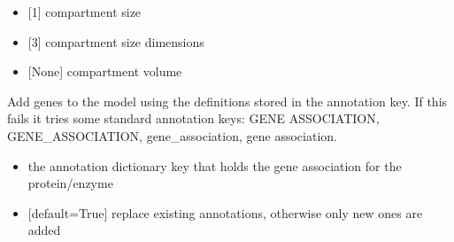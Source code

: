 \documentclass[letterpaper,10pt,english]{sphinxmanual}
\begin{document}
\begin{fulllineitems}
\begin{fulllineitems}
\begin{itemize}
\item {} 
\sphinxAtStartPar
{} {[}1{]} compartment size

\item {} 
\sphinxAtStartPar
{} {[}3{]} compartment size dimensions

\item {} 
\sphinxAtStartPar
{} {[}None{]} compartment volume

\end{itemize}

\end{fulllineitems}


\begin{fulllineitems}
\label{\detokenize{modules_doc:cbmpy.CBModel.Model.createGeneAssociationsFromAnnotations}}
\pysigstartsignatures
{}
\pysigstopsignatures
\sphinxAtStartPar
Add genes to the model using the definitions stored in the annotation key. If this fails it tries some standard annotation
keys: GENE ASSOCIATION, GENE\_ASSOCIATION, gene\_association, gene association.
\begin{itemize}
\item {} 
\sphinxAtStartPar
{} the annotation dictionary key that holds the gene association for the protein/enzyme

\item {} 
\sphinxAtStartPar
{} {[}default=True{]} replace existing annotations, otherwise only new ones are added

\end{itemize}

\end{fulllineitems}



\end{fulllineitems}
\end{document}
